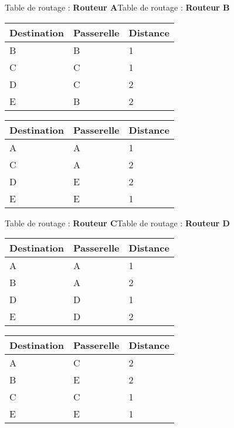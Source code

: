 \documentclass[11pt,a4paper]{article}
\begin{document}
Table de routage : \textbf{Routeur A}\hspace{4.8cm}Table de routage : \textbf{Routeur B}\medskip

\begin{tabular}{*{3}{|C{2.4cm}}|}\hline
Destination & Passerelle & Distance\\\hline
B & B & 1\\
C & C & 1\\
D & C & 2\\
E & B & 2\\\hline
\end{tabular}\hfill
\begin{tabular}{*{3}{|C{2.4cm}}|}\hline
Destination & Passerelle & Distance\\\hline
A & A & 1\\
C & A & 2\\
D & E & 2\\
E & E & 1\\\hline
\end{tabular}
\medskip

Table de routage : \textbf{Routeur C}\hspace{4.8cm}Table de routage : \textbf{Routeur D}\medskip

\begin{tabular}{*{3}{|C{2.4cm}}|}\hline
Destination & Passerelle & Distance\\\hline
A & A & 1\\
B & A & 2\\
D & D & 1\\
E & D & 2\\\hline
\end{tabular}\hfill
\begin{tabular}{*{3}{|C{2.4cm}}|}\hline
Destination & Passerelle & Distance\\\hline
A & C & 2\\
B & E & 2\\
C & C & 1\\
E & E & 1\\\hline
\end{tabular}
\medskip
%
\end{document}
